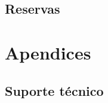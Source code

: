 \documentclass[a4paper,11pt,openany]{memoir}
\begin{document}
\chapter{Reservas}

\part{Apendices}
\begin{appendices}
  \chapter{Suporte técnico}
\end{appendices}
\end{document}
